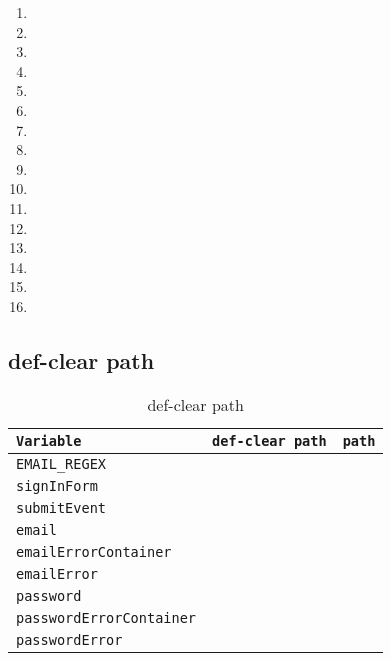 \documentclass{article}
\begin{document}
\begin{enumerate}[label = (Path \arabic*),itemindent=1cm]
    \item
    \item
    \item
    \item
    \item
    \item
    \item
    \item
    \item
    \item
    \item
    \item
    \item
    \item
    \item
    \item
\end{enumerate}

\subsection*{def-clear path}

\begin{table}[htp]
    \centering
    \begin{tabular}{l|c|c}
        \texttt{Variable}               & \texttt{def-clear path} & \texttt{path} \\
        \toprule
        \bottomrule
        \texttt{EMAIL\_REGEX}           &                         &               \\
        \hline
        \texttt{signInForm}             &                         &               \\
        \hline
        \texttt{submitEvent}            &                         &               \\
        \hline
        \texttt{email}                  &                         &               \\
        \hline
        \texttt{emailErrorContainer}    &                         &               \\
        \hline
        \texttt{emailError}             &                         &               \\
        \hline
        \texttt{password}               &                         &               \\
        \hline
        \texttt{passwordErrorContainer} &                         &               \\
        \hline
        \texttt{passwordError}          &                         &               \\
    \end{tabular}
    \caption{def-clear path}
\end{table}
\end{document}
